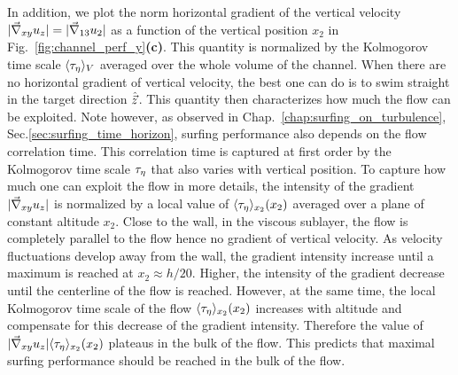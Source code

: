 In addition, we plot the norm horizontal gradient of the vertical velocity $\lvert\vec{\nabla}_{xy} u_{z}\rvert = \lvert\vec{\nabla}_{13} u_2\rvert$ as a function of the vertical position $x_2$ in Fig.~\ref{fig:channel_perf_y}\textbf{(c)}.
This quantity is normalized by the Kolmogorov time scale $\langle \tau_{\eta} \rangle_V$ averaged over the whole volume of the channel.
When there are no horizontal gradient of vertical velocity, the best one can do is to swim straight in the target direction $\hat{\vec{z}}$.
This quantity then characterizes how much the flow can be exploited.
Note however, as observed in Chap.~\ref{chap:surfing_on_turbulence}, Sec.\ref{sec:surfing_time_horizon}, surfing performance also depends on the flow correlation time.
This correlation time is captured at first order by the Kolmogorov time scale $\tau_{\eta}$ that also varies with vertical position.
To capture how much one can exploit the flow in more details, the intensity of the gradient $\lvert\vec{\nabla}_{xy} u_{z}\rvert$ is normalized by a local value of $\langle \tau_{\eta} \rangle_{x_2}(x_2)$ averaged over a plane of constant altitude $x_2$.
Close to the wall, in the viscous sublayer, the flow is completely parallel to the flow hence no gradient of vertical velocity.
As velocity fluctuations develop away from the wall, the gradient intensity increase until a maximum is reached at $x_2 \approx h / 20$.
Higher, the intensity of the gradient decrease until the centerline of the flow is reached.
However, at the same time, the local Kolmogorov time scale of the flow $\langle \tau_{\eta} \rangle_{x_2}(x_2)$ increases with altitude and compensate for this decrease of the gradient intensity.
Therefore the value of $\lvert\vec{\nabla}_{xy} u_{z}\rvert \langle \tau_{\eta} \rangle_{x_2}(x_2)$ plateaus in the bulk of the flow.
This predicts that maximal surfing performance should be reached in the bulk of the flow.

